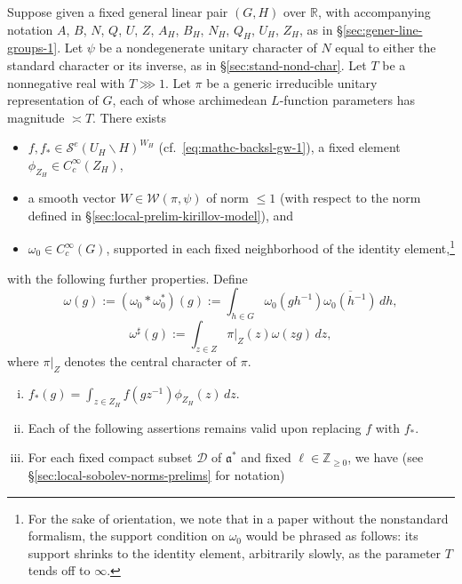 \begin{theorem}\label{thm:main-local-results}
  Suppose given a fixed general linear pair $(G,H)$ over $\mathbb{R}$, with accompanying notation $A$, $B$, $N$, $Q$, $U$, $Z$, $A_H$, $B_H$, $N_H$, $Q_H$, $U_H$, $Z_H$, as in \S\ref{sec:gener-line-groups-1}.  Let $\psi$ be a nondegenerate unitary character of $N$ equal to either the standard character or its inverse, as in \S\ref{sec:stand-nond-char}.  Let $T$ be a nonnegative real with $T \ggg 1$.  Let $\pi$ be a generic irreducible unitary representation of $G$, each of whose archimedean $L$-function parameters has magnitude $\asymp T$.  There exists
  \begin{itemize}
  \item $f, f_{\ast} \in \mathcal{S}^e(U_H \backslash H)^{W_H}$ (cf.\ \eqref{eq:mathc-backsl-gw-1}), a fixed element $\phi_{Z_H} \in C_c^\infty(Z_H)$,
  \item a smooth vector $W \in \mathcal{W}(\pi,\psi)$ of norm $\leq 1$ (with respect to the norm defined in \S\ref{sec:local-prelim-kirillov-model}), and
  \item $\omega_0 \in C_c^\infty(G)$, supported in each fixed neighborhood of the identity element,\footnote{For the sake of orientation, we note that in a paper without the nonstandard formalism, the support condition on $\omega_0$ would be phrased as follows: its support shrinks to the identity element, arbitrarily slowly, as the parameter $T$ tends off to $\infty$.}
  \end{itemize}
  with the following further properties.  Define
  \begin{equation*}
    \omega(g) := (\omega_0 \ast \omega_0^*)(g) := \int_{h \in G} \omega_0(g h^{-1}) \overline{\omega_0(h^{-1})} \, d h,
  \end{equation*}
  \begin{equation*}
    \omega^\sharp (g) := \int_{z \in Z}
    \pi|_Z (z) \omega(z g) \, d z,
  \end{equation*}
  where $\pi|_Z$ denotes the central character of $\pi$.
  \begin{enumerate}[(i)]
  \item \label{itm:sub-gln:5} $f_{\ast}(g) = \int_{z \in Z_H} f(g z^{-1}) \phi_{Z_H}(z) \, d z$.
  \item \label{itm:sub-gln:6} Each of the following assertions remains valid upon replacing $f$ with $f_{\ast}$.
  \item \label{itm:sub-gln:7} For each fixed compact subset $\mathcal{D}$ of $\mathfrak{a}^*$ and fixed $\ell \in \mathbb{Z}_{\geq 0}$, we have (see \S\ref{sec:local-sobolev-norms-prelims} for notation)

\end{enumerate}
\end{theorem}
